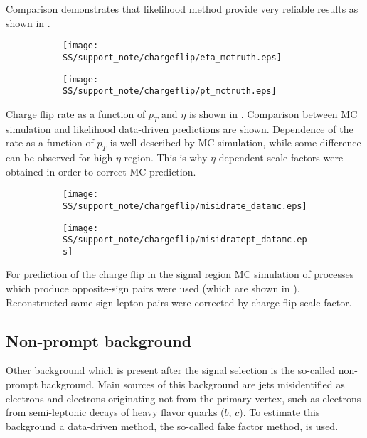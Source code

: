 Comparison demonstrates that likelihood method provide very reliable results as shown in
.

\begin{figure}
\begin{subfigure}{.5\textwidth}
  \centering
  \texttt{[image: SS/support\_note/chargeflip/eta\_mctruth.eps]}
\end{subfigure}%
\begin{subfigure}{.5\textwidth}
  \centering
  \texttt{[image: SS/support\_note/chargeflip/pt\_mctruth.eps]}
\end{subfigure}
\caption{\toDo}
\label{fig:likelihood_cross_check}
\end{figure}

Charge flip rate as a function of $p_T$ and $\eta$ is shown in .
Comparison between MC simulation and likelihood data-driven predictions are shown. 
Dependence of the rate as a function of $p_T$ is well described by MC simulation, while some difference can be observed
for high $\eta$ region. This is why $\eta$ dependent scale factors were obtained in order to correct MC prediction.

\begin{figure}
\begin{subfigure}{.5\textwidth}
  \centering
  \texttt{[image: SS/support\_note/chargeflip/misidrate\_datamc.eps]}
\end{subfigure}%
\begin{subfigure}{.5\textwidth}
  \centering
  \texttt{[image: SS/support\_note/chargeflip/misidratept\_datamc.eps]}
\end{subfigure}
\caption{\toDo}
\label{fig:charge_flip_data_vs_mc}
\end{figure}

For prediction of the charge flip in the signal region MC simulation of processes which produce opposite-sign pairs
were used (which are shown in ). Reconstructed same-sign lepton pairs were corrected by 
charge flip scale factor.

\subsection{Non-prompt background}

Other background which is present after the signal selection is the so-called non-prompt background.
Main sources of this background are jets misidentified as electrons and electrons originating not from 
the primary vertex, such as electrons from semi-leptonic decays of heavy flavor quarks ($b$, $c$).
To estimate this background a data-driven method, the so-called fake factor method, is used.

